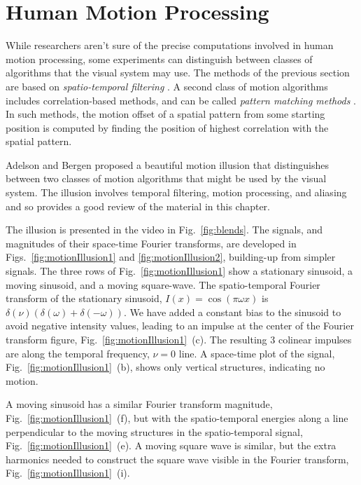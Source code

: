 

\section{Human Motion Processing}

While researchers aren't sure of the precise computations involved in human motion processing, some experiments  can distinguish between classes of algorithms that the visual system may use.  The methods of the previous section are based on {\em spatio-temporal filtering} \cite{Adelson85}.  A second class of motion algorithms includes correlation-based methods, and can be called {\em pattern matching methods} \cite{Adelson85}.  In such methods, the motion offset of a spatial pattern from some starting position is computed by finding the position of highest correlation with the spatial pattern.

Adelson and Bergen proposed a beautiful motion illusion that distinguishes between two classes of motion algorithms that might be used by the visual system.  The illusion involves temporal filtering, motion processing, and aliasing and so provides a good review of the material in this chapter.

The illusion is presented in the video in Fig.~\ref{fig:blends}. The signals, and magnitudes of their space-time Fourier transforms, are developed in Figs.~\ref{fig:motionIllusion1} and \ref{fig:motionIllusion2}, building-up from simpler signals.  The three rows of Fig.~\ref{fig:motionIllusion1} show a stationary sinusoid, a moving sinusoid, and a moving square-wave.  The spatio-temporal Fourier transform of the stationary sinusoid, $I(x) = \cos(\pi \omega x)$ is $\delta(\nu) (\delta(\omega) + \delta(-\omega))$.  We have added a constant bias to the sinusoid to avoid negative intensity values, leading to an impulse at the center of the Fourier transform figure, Fig.~\ref{fig:motionIllusion1}~(c).  The resulting 3 colinear impulses are along the temporal frequency, $\nu = 0$ line.  A space-time plot of the signal, Fig.~\ref{fig:motionIllusion1}~(b), shows only vertical structures, indicating no motion.

A moving sinusoid has a similar Fourier transform magnitude, Fig.~\ref{fig:motionIllusion1}~(f), but with the spatio-temporal energies along a line perpendicular to the moving structures in the spatio-temporal signal, Fig.~\ref{fig:motionIllusion1}~(e).  A moving square wave is similar, but the extra harmonics needed to construct the square wave visible in the Fourier transform, Fig.~\ref{fig:motionIllusion1}~(i).

